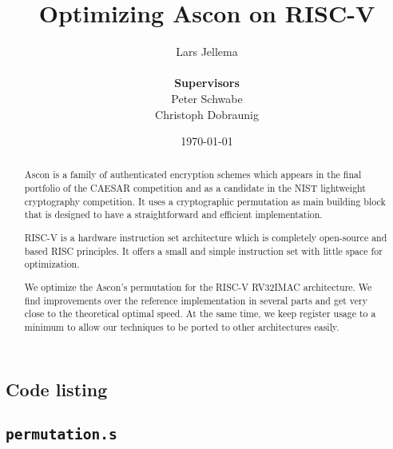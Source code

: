 \documentclass{article}
\title{Optimizing Ascon on RISC-V}
\author{Lars Jellema \\\\
    \textbf{\small Supervisors} \\
    \small Peter Schwabe \\
    \small Christoph Dobraunig}
\date{\today}
\begin{document}
\maketitle

\begin{abstract}

Ascon is a family of authenticated encryption schemes which appears in the final
portfolio of the CAESAR competition and as a candidate in the NIST lightweight
cryptography competition. It uses a cryptographic permutation as main building
block that is designed to have a straightforward and efficient implementation.

RISC-V is a hardware instruction set architecture which is completely
open-source and based RISC principles. It offers a small and simple instruction
set with little space for optimization.

We optimize the Ascon's permutation for the RISC-V RV32IMAC architecture. We
find improvements over the reference implementation in several parts and get
very close to the theoretical optimal speed. At the same time, we keep register
usage to a minimum to allow our techniques to be ported to other architectures
easily.

\end{abstract}

\clearpage










\begin{appendices}



\section{Code listing}

\subsection{\texttt{permutation.s}}



\end{appendices}
\end{document}
